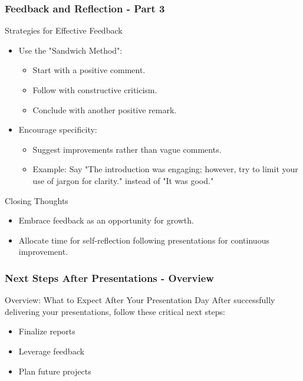\documentclass{beamer}
\begin{document}
\begin{frame}[fragile]
    \frametitle{Feedback and Reflection - Part 3}
    \begin{block}{Strategies for Effective Feedback}
        \begin{itemize}
            \item Use the "Sandwich Method":
                \begin{itemize}
                    \item Start with a positive comment.
                    \item Follow with constructive criticism.
                    \item Conclude with another positive remark.
                \end{itemize}
            \item Encourage specificity:
                \begin{itemize}
                    \item Suggest improvements rather than vague comments.
                    \item Example: Say "The introduction was engaging; however, try to limit your use of jargon for clarity." instead of "It was good."
                \end{itemize}
        \end{itemize}
    \end{block}
    
    \begin{block}{Closing Thoughts}
        \begin{itemize}
            \item Embrace feedback as an opportunity for growth.
            \item Allocate time for self-reflection following presentations for continuous improvement.
        \end{itemize}
    \end{block}
\end{frame}

\begin{frame}[fragile]
    \frametitle{Next Steps After Presentations - Overview}
    \begin{block}{Overview: What to Expect After Your Presentation Day}
    After successfully delivering your presentations, follow these critical next steps:
    \begin{itemize}
        \item Finalize reports
        \item Leverage feedback
        \item Plan future projects
    \end{itemize}
    \end{block}
\end{frame}
\end{document}
